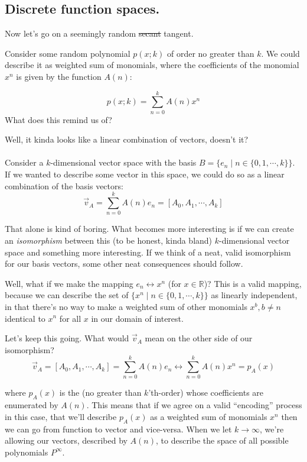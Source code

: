 \documentclass[letterpaper,12pt]{report}
\begin{document}

\subsection{Discrete function spaces.}

Now let's go on a seemingly random \sout{secant} tangent.\par
Consider some random polynomial \(p(x;k)\) of order no greater than \(k\).
We could describe it as weighted sum of monomials, where the coefficients
of the monomial \(x^n\) is given by the function \(A(n)\):

\[p(x;k) = \sum_{n=0}^{k}A(n) x^n\]
What does this remind us of?\par
Well, it kinda looks like a linear combination of vectors, doesn't it?
\\
\\
Consider a \(k\)-dimensional vector space with the basis
\(B = \{e_n \mid n \in \{0, 1, \cdots, k\}\}\).
If we wanted to describe some vector in this space, we could do so as a linear
combination of the basis vectors:
\[ \vec{v}_A = \sum_{n=0}^{k}A(n) e_n = [A_0, A_1, \cdots, A_k]\]

That alone is kind of boring. What becomes more interesting is if we can create an
\emph{isomorphism} between this
(to be honest, kinda bland) \(k\)-dimensional vector space and something
more interesting. If we think of a neat, valid isomorphism for our basis vectors,
some other neat consequences should follow. \par
Well, what if we make the mapping \(e_n \leftrightarrow x^n\) (for \(x \in \mathbb{R}\))?
This is a valid mapping, because we can describe the set of
\(\{x^n \mid n \in \{0, 1, \cdots, k\}\}\) as linearly independent, in that
there's no way to make a weighted sum of other monomials \(x^b, b\neq n\)
identical to \(x^n\) for all \(x\) in our domain of interest.\par
Let's keep this going. What would \(\vec{v}_A\) mean on the other side of our
isomorphism?
\[ \vec{v}_A = [A_0, A_1, \cdots, A_k] = \sum_{n=0}^{k}A(n) e_n
  \longleftrightarrow \sum_{n=0}^{k}A(n)x^n = p_A(x)  \]

where \(p_A(x)\) is the (no greater than \(k\)'th-order) whose coefficients
are enumerated by \(A(n)\). This means that if we agree on a valid ``encoding'' process
\textemdash{}
in this case, that we'll describe \(p_A(x)\) as a weighted sum of monomials \(x^n\)
\textemdash{}
then we can go from function to vector and vice-versa.
When we let \(k \rightarrow \infty\), we're allowing our vectors, described by \(A(n)\),
to describe the space of all possible polynomials \(P^\infty\).\par
\end{document}
